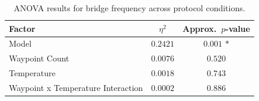 \begin{table}[t]
\centering
\caption{ANOVA results for bridge frequency across protocol conditions.}
\label{tab:anova}
\small
\begin{tabular}{lcc}
\toprule
Factor & $\eta^2$ & Approx.\ $p$-value \\
\midrule
    Model & $0.2421$ & $0.001$ $*$ \\
    Waypoint Count & $0.0076$ & $0.520$  \\
    Temperature & $0.0018$ & $0.743$  \\
    Waypoint x Temperature Interaction & $0.0002$ & $0.886$  \\
\bottomrule
\end{tabular}
\end{table}
